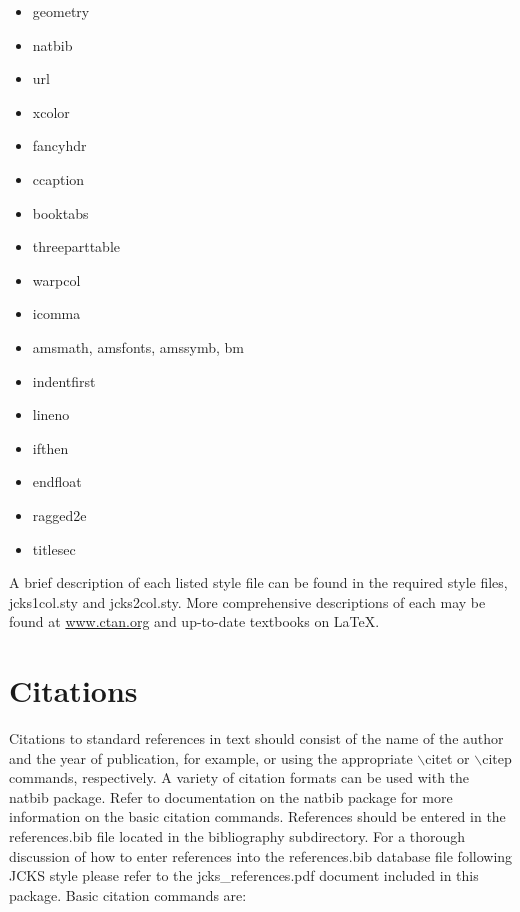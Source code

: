 \documentclass[12pt]{article}
\begin{document}
\begin{itemize}
\item geometry
\item natbib
\item url
\item xcolor
\item fancyhdr
\item ccaption
\item booktabs
\item threeparttable
\item warpcol
\item icomma
\item amsmath, amsfonts, amssymb, bm
\item indentfirst
\item lineno
\item ifthen
\item endfloat
\item ragged2e
\item titlesec
\end{itemize}
A brief description of each listed style file can be found in the required style files, jcks1col.sty and jcks2col.sty.  More comprehensive descriptions of each may be found at \url{www.ctan.org} and up-to-date textbooks on \LaTeX.

\section{Citations}
Citations to standard references in text should consist of the name of the author and the year of publication, for example, \citet{mohammadifield09} or \citep{fieldli10} using the appropriate $\backslash$citet or $\backslash$citep commands, respectively.  A variety of citation formats can be used with the natbib package.  Refer to documentation on the natbib package for more information on the basic citation commands.  References should be entered in the references.bib file located in the bibliography subdirectory.  For a thorough discussion of how to enter references into the references.bib database file following JCKS style please refer to the jcks\_references.pdf document included in this package.  Basic citation commands are:
\end{document}
